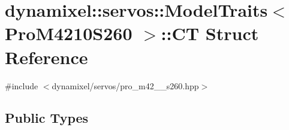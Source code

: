 \hypertarget{structdynamixel_1_1servos_1_1_model_traits_3_01_pro_m4210_s260_01_4_1_1_c_t}{}\section{dynamixel\+:\+:servos\+:\+:Model\+Traits$<$ Pro\+M4210\+S260 $>$\+:\+:C\+T Struct Reference}
\label{structdynamixel_1_1servos_1_1_model_traits_3_01_pro_m4210_s260_01_4_1_1_c_t}


{\ttfamily \#include $<$dynamixel/servos/pro\+\_\+m42\+\_\+\_\+s260.\+hpp$>$}

\subsection*{Public Types}
